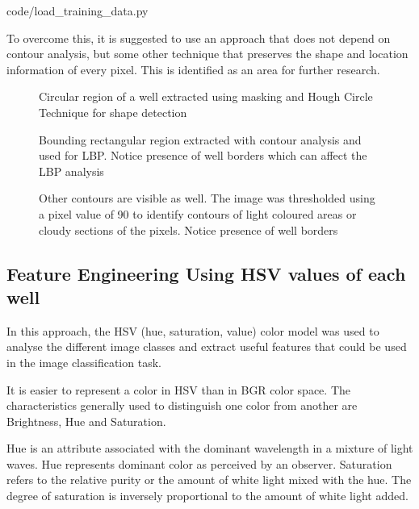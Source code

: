 \documentclass[a4paper,twoside,12pt]{report}
\begin{document}
\begin{enumerate}

{code/load_training_data.py}

To overcome this, it is suggested to use an approach that does not depend on contour analysis, but some other technique that preserves the shape and location information of every pixel.  This is identified as an area for further research. 

\begin{figure} [!htbp]
\centering
\caption[Extracted region of interest for histogramming] {Circular region of a well extracted using masking and Hough Circle Technique for shape detection}
\end{figure}

\begin{figure} [!htbp]
\centering
\caption[Extracted region of interest for texture analysis] {Bounding rectangular region extracted with contour analysis and used for LBP. Notice presence of well borders which can affect the LBP analysis}
\end{figure}

\begin{figure} [!htbp]
\centering
\caption[All contours drawn within the region of interest] {Other contours are visible as well.  The image was thresholded using a pixel value of 90 to identify contours of light coloured areas or cloudy sections of the pixels.  Notice presence of well borders}
\end{figure}

\end{enumerate}

\subsection{Feature Engineering Using HSV values of each well} 

In this approach, the HSV (hue, saturation, value) color model was used to analyse the different image classes and extract useful features that could be used in the image classification task. 

It is easier to represent a color in HSV than in BGR color space. The characteristics generally used to distinguish one color from another are Brightness, Hue and Saturation.   

Hue\cite{woods} is an attribute associated with the dominant wavelength in a mixture of light waves.  Hue represents dominant color as perceived by an observer.     Saturation refers to the relative purity or the amount of white light mixed with the hue.   The degree of saturation is inversely proportional to the amount of white light added. 
\end{document}
